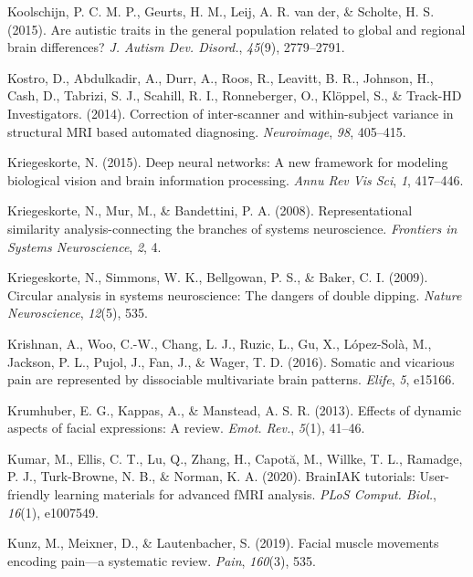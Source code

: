 \documentclass[11pt,american,a4paper,oneside,]{memoir} %
\begin{document}
\leavevmode\hypertarget{ref-Koolschijn2015-hd}{}%
Koolschijn, P. C. M. P., Geurts, H. M., Leij, A. R. van der, \& Scholte, H. S. (2015). Are autistic traits in the general population related to global and regional brain differences? \emph{J. Autism Dev. Disord.}, \emph{45}(9), 2779--2791.

\leavevmode\hypertarget{ref-Kostro2014-cm}{}%
Kostro, D., Abdulkadir, A., Durr, A., Roos, R., Leavitt, B. R., Johnson, H., Cash, D., Tabrizi, S. J., Scahill, R. I., Ronneberger, O., Klöppel, S., \& Track-HD Investigators. (2014). Correction of inter-scanner and within-subject variance in structural MRI based automated diagnosing. \emph{Neuroimage}, \emph{98}, 405--415.

\leavevmode\hypertarget{ref-Kriegeskorte2015-qi}{}%
Kriegeskorte, N. (2015). Deep neural networks: A new framework for modeling biological vision and brain information processing. \emph{Annu Rev Vis Sci}, \emph{1}, 417--446.

\leavevmode\hypertarget{ref-kriegeskorte2008representational}{}%
Kriegeskorte, N., Mur, M., \& Bandettini, P. A. (2008). Representational similarity analysis-connecting the branches of systems neuroscience. \emph{Frontiers in Systems Neuroscience}, \emph{2}, 4.

\leavevmode\hypertarget{ref-kriegeskorte2009circular}{}%
Kriegeskorte, N., Simmons, W. K., Bellgowan, P. S., \& Baker, C. I. (2009). Circular analysis in systems neuroscience: The dangers of double dipping. \emph{Nature Neuroscience}, \emph{12}(5), 535.

\leavevmode\hypertarget{ref-krishnan2016somatic}{}%
Krishnan, A., Woo, C.-W., Chang, L. J., Ruzic, L., Gu, X., López-Solà, M., Jackson, P. L., Pujol, J., Fan, J., \& Wager, T. D. (2016). Somatic and vicarious pain are represented by dissociable multivariate brain patterns. \emph{Elife}, \emph{5}, e15166.

\leavevmode\hypertarget{ref-Krumhuber2013-qi}{}%
Krumhuber, E. G., Kappas, A., \& Manstead, A. S. R. (2013). Effects of dynamic aspects of facial expressions: A review. \emph{Emot. Rev.}, \emph{5}(1), 41--46.

\leavevmode\hypertarget{ref-Kumar2020-eo}{}%
Kumar, M., Ellis, C. T., Lu, Q., Zhang, H., Capotă, M., Willke, T. L., Ramadge, P. J., Turk-Browne, N. B., \& Norman, K. A. (2020). BrainIAK tutorials: User-friendly learning materials for advanced fMRI analysis. \emph{PLoS Comput. Biol.}, \emph{16}(1), e1007549.

\leavevmode\hypertarget{ref-Kunz2019-uh}{}%
Kunz, M., Meixner, D., \& Lautenbacher, S. (2019). Facial muscle movements encoding pain---a systematic review. \emph{Pain}, \emph{160}(3), 535.
\end{document}
